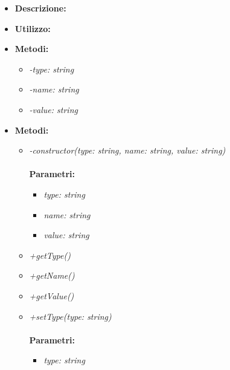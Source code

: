\begin{itemize}
	\item \textbf{Descrizione:}\\
	
	\item \textbf{Utilizzo:}\\
	
	\item \textbf{Metodi:}
		\begin{itemize}
			\item \emph{-type: string}\\
    		
    		\item \emph{-name: string}\\
    		
    		\item \emph{-value: string}\\
    		
		\end{itemize}
	\item \textbf{Metodi:}
		\begin{itemize}
			\item \emph{-constructor(type: string, name: string, value: string)}\\
    		\\
    		\textbf{Parametri:}
    		\begin{itemize}
    			\item \emph{type: string}\\
    			
    			\item \emph{name: string}\\
    			
    			\item \emph{value: string}\\
    			
    		\end{itemize}
    		\item \emph{+getType()}\\
    		
    		\item \emph{+getName()}\\
    		
    		\item \emph{+getValue()}\\
    		
    		\item \emph{+setType(type: string)}\\
    		\\
    		\textbf{Parametri:}
    		\begin{itemize}
    			\item \emph{type: string}\\
    			

\end{itemize}
\end{itemize}
\end{itemize}
